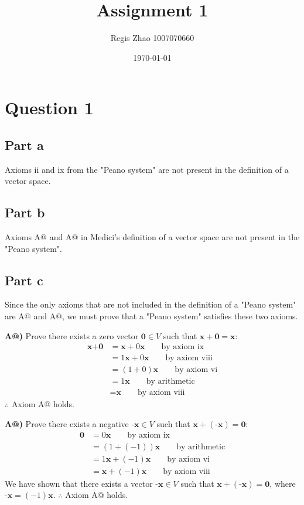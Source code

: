 \documentclass[10pt, letterpaper]{article}
\title{Assignment 1}
\author{Regis Zhao 1007070660}
\date{\today}
\makeatletter
\newcommand*{\rom}[1]{\expandafter\@slowromancap\romannumeral #1@}
\makeatother
\begin{document}
\maketitle


\section{Question 1}

\subsection{Part a}
Axioms ii and ix from the "Peano system" are not present in the definition
of a vector space.

\subsection{Part b}
Axioms A\rom{3} and A\rom{4} in Medici's definition of a vector space are not
present in the "Peano system".

\subsection{Part c}
Since the only axioms that are not included in the definition of a "Peano system"
are A\rom{3} and A\rom{4}, we must prove that a "Peano system" satisfies
these two axioms.

\textbf{A\rom{3})} Prove there exists a zero vector $\textbf{0} \in V$ such that 
$ \textbf{x} + \textbf{0} = \textbf{x} $:
%
\begin{align*}
    \textbf{x} + \textbf{0} &= \textbf{x} + 0\textbf{x} \qquad \text{by axiom ix}\\
    &= 1\textbf{x} + 0\textbf{x} \qquad \text{by axiom viii}\\
    &= (1+0)\textbf{x} \qquad \text{by axiom vi}\\
    &= 1\textbf{x} \qquad \text{by arithmetic}\\
    &= \textbf{x} \qquad \text{by axiom viii}
\end{align*}
$\therefore$ Axiom A\rom{3} holds.

\textbf{A\rom{4})} Prove there exists a negative $\textbf{-x} \in V$ such that 
$ \textbf{x} + (\textbf{-x}) = \textbf{0} $:
%
\begin{align*}
    \textbf{0} &= 0\textbf{x} \qquad \text{by axiom ix}\\
    &= (1+(-1))\textbf{x} \qquad \text{by arithmetic}\\
    &= 1\textbf{x} + (-1) \textbf{x} \qquad \text{by axiom vi}\\
    &= \textbf{x} + (-1) \textbf{x} \qquad \text{by axiom viii}
\end{align*}
%
We have shown that there exists a vector $\textbf{-x} \in V$ such 
that $ \textbf{x} + (\textbf{-x}) = \textbf{0} $, where 
$\textbf{-x} = (-1) \textbf{x} $. $\therefore$ Axiom A\rom{4} holds.
\end{document}
